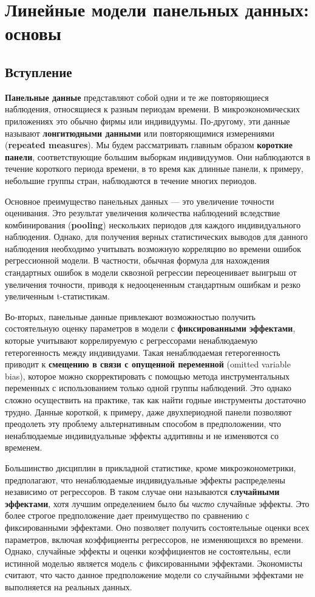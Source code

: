 \chapter{Линейные модели панельных данных: основы}
\section{Вступление}
\textbf{Панельные данные} представляют собой одни и те же повторяющиеся наблюдения, относящиеся к разным периодам времени. В микроэкономических приложениях это обычно фирмы или индивидуумы. По-другому, эти данные называют \textbf{лонгитюдными данными} или повторяющимися измерениями (\textbf{repeated measures}). Мы будем рассматривать главным образом \textbf{короткие панели}, соответствующие большим выборкам индивидуумов. Они наблюдаются в течение короткого периода времени, в то время как длинные панели, к примеру, небольшие группы стран, наблюдаются в течение многих периодов.

Основное преимущество панельных данных  --- это увеличение точности оценивания. Это результат увеличения количества наблюдений вследствие комбинирования (\textbf{pooling}) нескольких периодов для каждого индивидуального наблюдения. Однако, для получения верных статистических выводов для данного наблюдения необходимо учитывать возможную корреляцию во времени ошибок регрессионной модели. В частности, обычная формула для нахождения стандартных ошибок в модели сквозной регрессии переоценивает выигрыш от увеличения точности, приводя к недооцененным стандартным ошибкам и  резко увеличенным t-статистикам.

Во-вторых, панельные данные привлекают возможностью получить состоятельную оценку параметров в модели с \textbf{фиксированными эффектами}, которые учитывают коррелируемую с регрессорами ненаблюдаемую гетерогенность между индивидуами. Такая ненаблюдаемая гетерогенность приводит к \textbf{смещению в связи с опущенной переменной} (omitted variable bias), которое можно скорректировать с помощью метода инструментальных переменных с использованием только одной группы наблюдений. Это однако сложно осуществить на практике, так как найти годные инструменты достаточно трудно. Данные короткой, к примеру, даже двухпериодной панели позволяют преодолеть эту проблему альтернативным способом в предположении, что ненаблюдаемые индивидуальные эффекты аддитивны и не изменяются со временем.

Большинство дисциплин в прикладной статистике, кроме микроэконометрики, предполагают, что ненаблюдаемые индивидуальные эффекты распределены независимо от регрессоров. В таком случае они называются \textbf{случайными эффектами}, хотя лучшим определением было бы {\it чисто} случайные эффекты. Это более строгое предположение дает преимущество  по сравнению с фиксированными эффектами. Оно позволяет получить состоятельные оценки всех параметров, включая коэффициенты регрессоров, не изменяющихся во времени. Однако, случайные эффекты и оценки коэффициентов не состоятельны, если истинной моделью является модель с фиксированными эффектами. Экономисты считают, что часто данное предположение модели со случайными эффектами не выполняется на реальных данных.

